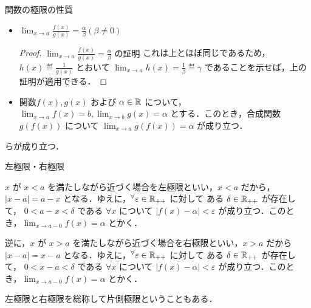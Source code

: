 \documentclass[a4paper]{ltjsarticle}
\begin{document}
\begin{theorem}{関数の極限の性質}{}
\begin{itemize}
\begin{proof}{$\displaystyle \lim_{x \to a} f(x)g(x) = \alpha\beta$ の証明}{}
        このとき，正の実数 $M = \max\{|\alpha - \varepsilon_1|, |\alpha + \varepsilon_1|\}$ ととると，$f(x) < M$ である．
        $\delta = \min\{\delta_1, \delta_2\}$ とすると，三角不等式より $|f(x)g(x) - \alpha\beta| = |f(x)(g(x) - \beta) + \beta(f(x) - \alpha)| = |f(x)(g(x) - \beta)| + |\beta(f(x) - \alpha)| 
        = |\alpha|\varepsilon_2 + |\beta|\varepsilon < M\varepsilon_2 + |\beta|\varepsilon_1$ である．$\varepsilon \eqdef |\alpha|\varepsilon_2 + |\beta|\varepsilon < M\varepsilon_2 + |\beta|\varepsilon_1$ 
        改めておく（$\varepsilon_1 と \varepsilon_2$ が正の実数だから $\varepsilon$ も正）．ゆえに$\displaystyle \lim_{x \to a} f(x)g(x) = \alpha\beta$ が示された．
      \end{proof}
      \item $\displaystyle \lim_{x \to a} \frac{f(x)}{g(x)} = \frac{\alpha}{\beta} (\beta \neq 0)$
      \begin{proof}{$\displaystyle \lim_{x \to a} \frac{f(x)}{g(x)} = \frac{\alpha}{\beta}$ の証明}{}
        これは上とほぼ同じであるため，$h(x) \eqdef \frac{1}{g(x)}$ とおいて $\lim_{x \to a} h(x) = \frac{1}{\beta} \eqdef \gamma$ であることを示せば，上の証明が適用できる．
      \end{proof}
      \item 関数$f(x), g(x)$ および $\alpha \in \mathbb{R}$ について，$\lim_{x \to a} f(x) = b, \lim_{x \to b} g(x) = \alpha$ とする．このとき，合成関数 $g(f(x))$ について $\lim_{x \to a}g(f(x)) = \alpha$ が成り立つ．
    \end{itemize}

    らが成り立つ．
  \end{theorem}
  
  \begin{tcb}{左極限・右極限}{}
  
  $x$ が $x < a$ を満たしながら近づく場合を左極限といい，$x < a$ だから，$|x - a| = a - x$ となる．ゆえに，$\forall \varepsilon \in \R_{++}$ に対して ある $\delta \in \mathbb{R}_{++}$ が存在して， 
  $0 < a - x < \delta$ である $\forall x$ について $|f(x) - \alpha| < \varepsilon$ が成り立つ．このとき，$\displaystyle \lim_{x \to a-0} f(x) = \alpha$ とかく．

  逆に，$x$ が $x > a$ を満たしながら近づく場合を右極限といい，$x > a$ だから $|x - a| = x - a$ となる．ゆえに，$\forall \varepsilon \in \R_{++}$ に対して ある $\delta \in \mathbb{R}_{++}$ が存在して， 
  $0 < x - a < \delta$ である $\forall x$ について $|f(x) - \alpha| < \varepsilon$ が成り立つ．このとき，$\displaystyle \lim_{x \to a-0} f(x) = \alpha$ とかく．

  左極限と右極限を総称して片側極限ということもある．
  \end{tcb}
\end{document}
